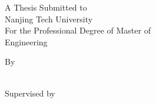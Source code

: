 

\thispagestyle{empty}
\renewcommand{\baselinestretch}{1.5}  %
\vspace*{0.5cm}
\setmainfont{Times New Roman}

\begin{center}{ \textbf{\MakeUppercase{\the\Etitle}} \par}\end{center}

\vspace*{25mm} %

\begin{center}
A Thesis Submitted to\\
Nanjing Tech University\\
For the Professional Degree of Master of\\
Engineering\\

\vspace*{20mm} %

By\\
{\sc \the\Eauthor}      \\

\vspace*{20mm} %

Supervised by\\
{\sc \the\Esupervisor}\\


\vspace*{25mm} %

\the\Edate

\end{center}
  \iflib
  \else
  \newpage
  \thispagestyle{empty}
  \cleardoublepage
  \fi
  
